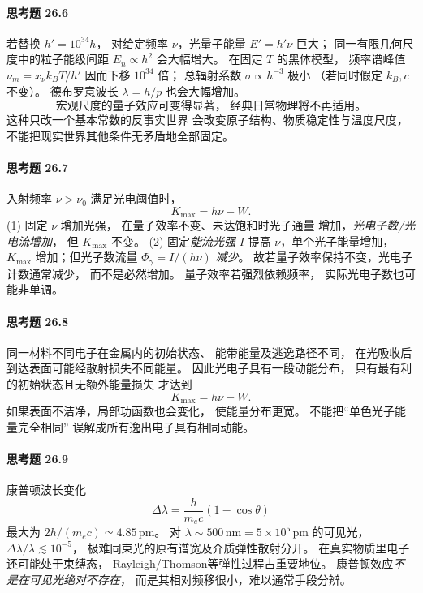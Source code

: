\paragraph{思考题 26.6}
若替换 \(h'=10^{34}h\)，
对给定频率 \(\nu\)，光量子能量
\(E'=h'\nu\) 巨大；
同一有限几何尺度中的粒子能级间距
\(E_n\propto h^2\) 会大幅增大。
在固定 \(T\) 的黑体模型，
频率谱峰值
\(\nu_m=x_\nu k_BT/h'\) 因而下移
\(10^{34}\) 倍；
总辐射系数
\(\sigma\propto h^{-3}\) 极小
（若同时假定 \(k_B,c\) 不变）。
德布罗意波长 \(\lambda=h/p\) 也会大幅增加。
\[
\boxed{\text{宏观尺度的量子效应可变得显著，
经典日常物理将不再适用。}}
\]
这种只改一个基本常数的反事实世界
会改变原子结构、物质稳定性与温度尺度，
不能把现实世界其他条件无矛盾地全部固定。

\paragraph{思考题 26.7}
入射频率 \(\nu>\nu_0\) 满足光电阈值时，
\[
\boxed{K_{\max}=h\nu-W}.
\]
(1) 固定 \(\nu\) 增加光强，
在量子效率不变、未达饱和时光子通量
增加，\emph{光电子数/光电流增加}，
但 \(K_{\max}\) 不变。
(2) 固定\emph{能流光强} \(I\)
提高 \(\nu\)，单个光子能量增加，
\(K_{\max}\) 增加；但光子数流量
\(\Phi_\gamma=I/(h\nu)\) \emph{减少}。
故若量子效率保持不变，光电子计数通常减少，
而不是必然增加。
量子效率若强烈依赖频率，
实际光电子数也可能非单调。

\paragraph{思考题 26.8}
同一材料不同电子在金属内的初始状态、
能带能量及逃逸路径不同，
在光吸收后到达表面可能经散射损失不同能量。
因此光电子具有一段动能分布，
只有最有利的初始状态且无额外能量损失
才达到
\[
\boxed{K_{\max}=h\nu-W}.
\]
如果表面不洁净，局部功函数也会变化，
使能量分布更宽。
不能把“单色光子能量完全相同”
误解成所有逸出电子具有相同动能。

\paragraph{思考题 26.9}
康普顿波长变化
\[
\boxed{\Delta\lambda=
\frac{h}{m_ec}(1-\cos\theta)}
\]
最大为
\(2h/(m_ec)\simeq4.85\,\mathrm{pm}\)。
对 \(\lambda\sim500\,\mathrm{nm}
=5\times10^5\,\mathrm{pm}\) 的可见光，
\(\Delta\lambda/\lambda\lesssim10^{-5}\)，
极难同束光的原有谱宽及介质弹性散射分开。
在真实物质里电子还可能处于束缚态，
Rayleigh/Thomson等弹性过程占重要地位。
康普顿效应\emph{不是在可见光绝对不存在}，
而是其相对频移很小，难以通常手段分辨。

